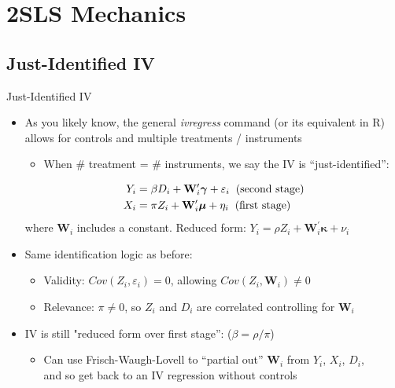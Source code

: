 \documentclass{beamer}
\begin{document}
\section{2SLS Mechanics}

\subsection{Just-Identified IV}
\begin{frame}{Just-Identified IV}
\begin{itemize}
\item As you likely know, the general \emph{ivregress} command (or its equivalent in R) allows for controls and multiple treatments / instruments\smallskip
\begin{itemize}
\item When \# treatment = \# instruments, we say the IV is ``just-identified'':
\end{itemize}\pause{}\vspace{-0.3cm}
\begin{align*}
Y_i &=  \beta D_i +\mathbf{W}_i^\prime\boldsymbol{\gamma} +  \varepsilon_i\hspace{0.2cm}\text{(second stage)}\\
X_i &= \pi Z_i + \mathbf{W}_i^\prime\boldsymbol{\mu} + \eta_i\hspace{0.2cm}\text{(first stage)}
\end{align*}
where $\mathbf{W}_i$ includes a constant.\pause{} Reduced form: $Y_i= \rho Z_i + \mathbf{W}_i^\prime\boldsymbol{\kappa}+\nu_i $\pause{}\vspace{0.3cm}
\item Same identification logic as before:
\smallskip
\begin{itemize}
\item Validity: $Cov(Z_i,\varepsilon_i)=0$, allowing $Cov(Z_i,\mathbf{W}_i)\neq 0$\pause{}\smallskip
\item Relevance: $\pi\neq 0$, so $Z_i$ and $D_i$ are correlated controlling for $\mathbf{W}_i$
\end{itemize}\pause{}\medskip
\item IV is still "reduced form over first stage'': ($\beta=\rho/\pi$)\pause{}\vspace{0.1cm}
\begin{itemize}
\item Can use Frisch-Waugh-Lovell to ``partial out'' $\mathbf{W}_i$ from $Y_i$, $X_i$, $D_i$, \\ and so get back to an IV regression without controls
\end{itemize}
\end{itemize}
\end{frame}
\end{document}
